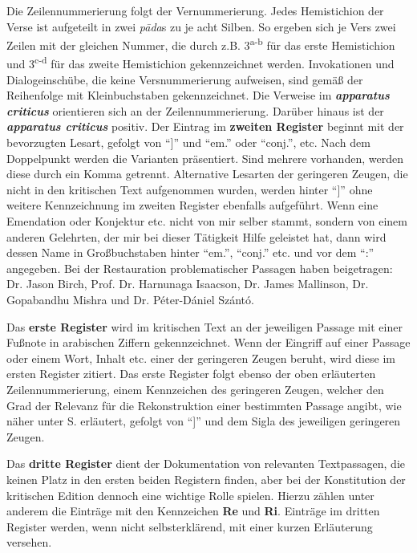 \documentclass[a4paper,12pt]{article}
\begin{document}
{Die Zeilennummerierung folgt der Vernummerierung. Jedes Hemistichion der Verse ist aufgeteilt in zwei \textit{pāda}s zu je acht Silben. So ergeben sich je Vers zwei Zeilen mit der gleichen Nummer, die durch z.B. 3\textsuperscript{a-b} für das erste Hemistichion und 3\textsuperscript{c-d} für das zweite Hemistichion gekennzeichnet werden. Invokationen und Dialogeinschübe, die keine Versnummerierung aufweisen, sind gemäß der Reihenfolge mit Kleinbuchstaben gekennzeichnet. Die Verweise im \textbf{\textit{apparatus criticus}} orientieren sich an der Zeilennummerierung. Darüber hinaus ist der \textbf{\textit{apparatus criticus}} positiv. Der Eintrag im \textbf{zweiten Register} beginnt mit der bevorzugten Lesart, gefolgt von ``]'' und ``em.'' oder ``conj.'', etc. Nach dem Doppelpunkt werden die Varianten präsentiert. Sind mehrere vorhanden, werden diese durch ein Komma getrennt. Alternative Lesarten der geringeren Zeugen, die nicht in den kritischen Text aufgenommen wurden, werden hinter ``]'' ohne weitere Kennzeichnung im zweiten Register ebenfalls aufgeführt. Wenn eine Emendation oder Konjektur etc. nicht von mir selber stammt, sondern von einem anderen Gelehrten, der mir bei dieser Tätigkeit Hilfe geleistet hat, dann wird dessen Name in Großbuchstaben hinter ``em.'', ``conj.'' etc. und vor dem ``:'' angegeben. Bei der Restauration problematischer Passagen haben beigetragen: Dr. Jason Birch, Prof. Dr. Harnunaga Isaacson, Dr. James Mallinson, Dr. Gopabandhu Mishra und Dr. Péter-Dániel Szántó.  

    Das \textbf{erste Register} wird im kritischen Text an der jeweiligen Passage mit einer Fußnote in arabischen Ziffern gekennzeichnet. Wenn der Eingriff auf einer Passage oder einem Wort, Inhalt etc. einer der geringeren Zeugen beruht, wird diese im ersten Register zitiert. Das erste Register folgt ebenso der oben erläuterten Zeilennummerierung, einem Kennzeichen des geringeren Zeugen, welcher den Grad der Relevanz für die Rekonstruktion einer bestimmten Passage angibt, wie näher unter S.\pageref{kennz} erläutert, gefolgt von ``]'' und dem Sigla des jeweiligen geringeren Zeugen.

      Das \textbf{dritte Register} dient der Dokumentation von relevanten Textpassagen, die keinen Platz in den ersten beiden Registern finden, aber bei der Konstitution der kritischen Edition dennoch eine wichtige Rolle spielen. Hierzu zählen unter anderem die Einträge mit den Kennzeichen \textbf{Re} und \textbf{Ri}. Einträge im dritten Register werden, wenn nicht selbsterklärend, mit einer kurzen Erläuterung versehen.

}
\end{document}
